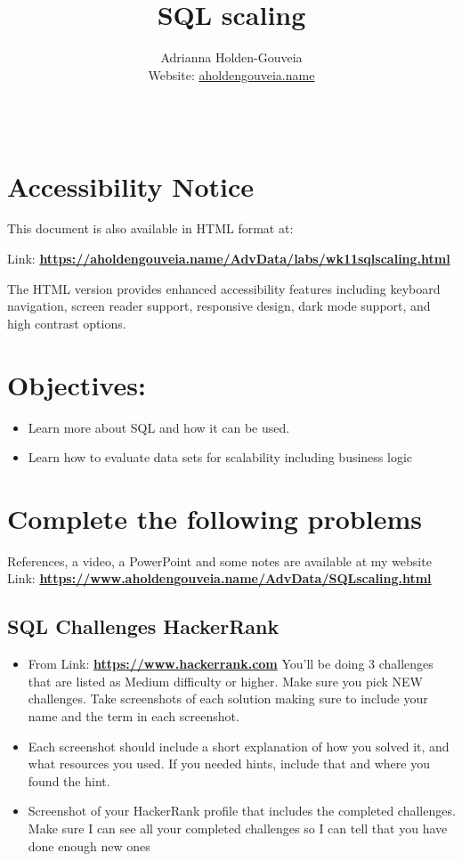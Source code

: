 \documentclass[12pt]{article}
\title{SQL scaling}
\author{
        Adrianna Holden-Gouveia \\
        Website: \href{https://aholdengouveia.name}{aholdengouveia.name}\\ 
        \date{\vspace{-5ex}}
        \faGithub {: aholdengouveia} \\
        }
\begin{document}
    

\maketitle



\section*{Accessibility Notice}
This document is also available in HTML format at:

Link: \href{https://aholdengouveia.name/AdvData/labs/wk11sqlscaling.html}{\textbf{https://aholdengouveia.name/AdvData/labs/wk11sqlscaling.html}}

The HTML version provides enhanced accessibility features including keyboard navigation, screen reader support, responsive design, dark mode support, and high contrast options.

\section*{Objectives:}
\begin{itemize}
    \item Learn more about SQL and how it can be used.
    \item Learn how to evaluate data sets for scalability including business logic
\end{itemize}
\section*{Complete the following problems}

References, a video, a PowerPoint and some notes are available at my website
Link: \href{https://www.aholdengouveia.name/AdvData/SQLscaling.html}{\textbf{https://www.aholdengouveia.name/AdvData/SQLscaling.html}}

\subsection*{SQL Challenges HackerRank}

    \begin{itemize}
        \item From Link: \href{https://www.hackerrank.com}{\textbf{https://www.hackerrank.com}} You'll be doing 3 challenges that are listed as Medium difficulty or higher.  Make sure you pick NEW challenges. Take screenshots of each solution making sure to include your name and the term in each screenshot.
        \item Each screenshot should include a short explanation of how you solved it, and what resources you used.  If you needed hints, include that and where you found the hint. 
        \item Screenshot of your HackerRank profile that includes the completed challenges. Make sure I can see all your completed challenges so I can tell that you have done enough new ones
    \end{itemize}
\end{document}
